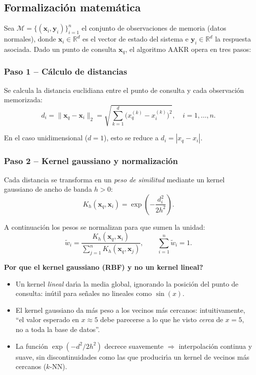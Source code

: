 \documentclass[12pt,a4paper]{article}
\newcommand{\porque}[2]{%
  \vspace{8pt}%
  \begin{mdframed}[backgroundcolor=porqueFondo,
                   linecolor=porqueBorde,
                   linewidth=1.5pt,
                   leftmargin=0pt,
                   rightmargin=0pt,
                   innerleftmargin=10pt,
                   innerrightmargin=10pt,
                   innertopmargin=6pt,
                   innerbottommargin=6pt]
    {\color{porqueBorde}\bfseries\small Por que #1}\\[3pt]
    {\small #2}
  \end{mdframed}%
  \vspace{8pt}%
}
\begin{document}
\subsection{Formalizaci\'on matem\'atica}

Sea $\mathcal{M} = \{(\mathbf{x}_i, \mathbf{y}_i)\}_{i=1}^n$ el conjunto de
observaciones de memoria (datos normales), donde $\mathbf{x}_i \in \mathbb{R}^d$
es el vector de estado del sistema e $\mathbf{y}_i \in \mathbb{R}^d$ la respuesta
asociada. Dado un punto de consulta $\mathbf{x}_q$, el algoritmo AAKR opera en tres
pasos:

\subsubsection{Paso 1 -- C\'alculo de distancias}

Se calcula la distancia euclidiana entre el punto de consulta y cada observaci\'on
memorizada:
\begin{equation}\label{eq:dist}
  d_i = \|\mathbf{x}_q - \mathbf{x}_i\|_2
      = \sqrt{\sum_{k=1}^{d} \bigl(x_q^{(k)} - x_i^{(k)}\bigr)^2},
  \quad i = 1, \ldots, n.
\end{equation}

En el caso unidimensional ($d=1$), esto se reduce a $d_i = |x_q - x_i|$.

\subsubsection{Paso 2 -- Kernel gaussiano y normalizaci\'on}

Cada distancia se transforma en un \emph{peso de similitud} mediante un kernel
gaussiano de ancho de banda $h > 0$:
\begin{equation}\label{eq:kernel}
  K_h(\mathbf{x}_q, \mathbf{x}_i)
    = \exp\!\left(-\frac{d_i^2}{2h^2}\right).
\end{equation}

A continuaci\'on los pesos se normalizan para que sumen la unidad:
\begin{equation}\label{eq:norm}
  \tilde{w}_i
    = \frac{K_h(\mathbf{x}_q, \mathbf{x}_i)}
           {\displaystyle\sum_{j=1}^{n} K_h(\mathbf{x}_q, \mathbf{x}_j)},
  \qquad \sum_{i=1}^n \tilde{w}_i = 1.
\end{equation}

\porque{el kernel gaussiano (RBF) y no un kernel lineal?}{%
\begin{itemize}[leftmargin=1.5em,noitemsep]
  \item Un kernel \emph{lineal} dar\'{\i}a la media global, ignorando la posici\'on del
        punto de consulta: in\'util para se\~nales no lineales como $\sin(x)$.
  \item El kernel gaussiano da m\'as peso a los vecinos m\'as cercanos: intuitivamente,
        ``el valor esperado en $x \approx 5$ debe parecerse a lo que he visto
        \emph{cerca} de $x=5$, no a toda la base de datos''.
  \item La funci\'on $\exp(-d^2/2h^2)$ decrece suavemente $\Rightarrow$ interpolaci\'on
        continua y suave, sin discontinuidades como las que producir\'{\i}a un kernel
        de vecinos m\'as cercanos ($k$-NN).
\end{itemize}}
\end{document}
